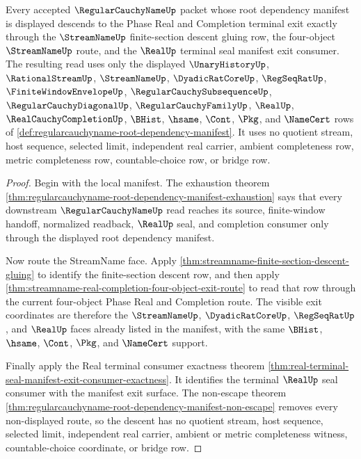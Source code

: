 \begin{theorem}
\label{thm:regularcauchyname-manifest-exit-descent-exactness}
Every accepted $\RegularCauchyNameUp$ packet whose root dependency manifest is displayed descends to the Phase Real and Completion terminal exit exactly through the $\StreamNameUp$ finite-section descent gluing row, the four-object $\StreamNameUp$ route, and the $\RealUp$ terminal seal manifest exit consumer. The resulting read uses only the displayed $\UnaryHistoryUp$, $\RationalStreamUp$, $\StreamNameUp$, $\DyadicRatCoreUp$, $\RegSeqRatUp$, $\FiniteWindowEnvelopeUp$, $\RegularCauchySubsequenceUp$, $\RegularCauchyDiagonalUp$, $\RegularCauchyFamilyUp$, $\RealUp$, $\RealCauchyCompletionUp$, $\BHist$, $\hsame$, $\Cont$, $\Pkg$, and $\NameCert$ rows of \autoref{def:regularcauchyname-root-dependency-manifest}. It uses no quotient stream, host sequence, selected limit, independent real carrier, ambient completeness row, metric completeness row, countable-choice row, or bridge row.
\end{theorem}
\begin{proof}
Begin with the local manifest. The exhaustion theorem \autoref{thm:regularcauchyname-root-dependency-manifest-exhaustion} says that every downstream $\RegularCauchyNameUp$ read reaches its source, finite-window handoff, normalized readback, $\RealUp$ seal, and completion consumer only through the displayed root dependency manifest.

Now route the StreamName face. Apply \autoref{thm:streamname-finite-section-descent-gluing} to identify the finite-section descent row, and then apply \autoref{thm:streamname-real-completion-four-object-exit-route} to read that row through the current four-object Phase Real and Completion route. The visible exit coordinates are therefore the $\StreamNameUp$, $\DyadicRatCoreUp$, $\RegSeqRatUp$, and $\RealUp$ faces already listed in the manifest, with the same $\BHist$, $\hsame$, $\Cont$, $\Pkg$, and $\NameCert$ support.

Finally apply the Real terminal consumer exactness theorem \autoref{thm:real-terminal-seal-manifest-exit-consumer-exactness}. It identifies the terminal $\RealUp$ seal consumer with the manifest exit surface. The non-escape theorem \autoref{thm:regularcauchyname-root-dependency-manifest-non-escape} removes every non-displayed route, so the descent has no quotient stream, host sequence, selected limit, independent real carrier, ambient or metric completeness witness, countable-choice coordinate, or bridge row.
\end{proof}

